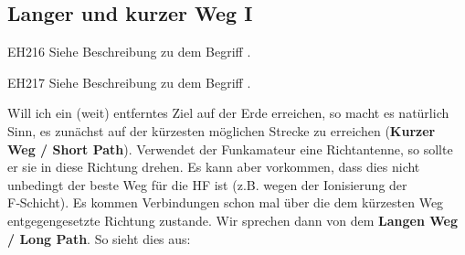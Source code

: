 \subsection{Langer und kurzer Weg I}

\begin{sol}{EH216}
Siehe Beschreibung zu dem Begriff .
\end{sol}

\begin{sol}{EH217}
Siehe Beschreibung zu dem Begriff .
\end{sol}

\begin{ohmchapter}
    Will ich ein (weit) entferntes Ziel auf der Erde erreichen, so macht es natürlich Sinn, es zunächst auf der kürzesten möglichen Strecke zu erreichen (\textbf{Kurzer Weg / Short Path}). Verwendet der Funkamateur eine Richtantenne, so sollte er sie in diese Richtung drehen. Es kann aber vorkommen, dass dies nicht unbedingt der beste Weg für die HF ist (z.B. wegen der Ionisierung der F‑Schicht). Es kommen Verbindungen schon mal über die dem kürzesten Weg entgegengesetzte Richtung zustande.
    Wir sprechen dann von dem \textbf{Langen Weg / Long Path}.
    So sieht dies aus:
\end{ohmchapter}  
